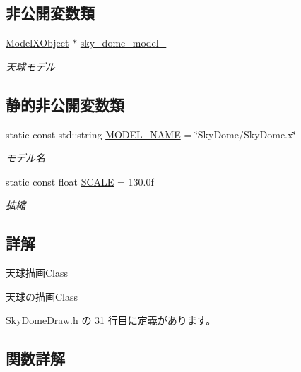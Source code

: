 \subsection*{非公開変数類}
\begin{DoxyCompactItemize}
\item 
\mbox{\hyperlink{class_model_x_object}{Model\+X\+Object}} $\ast$ \mbox{\hyperlink{class_sky_dome_draw_a2453fb04f979443c61acc10eafa183aa}{sky\+\_\+dome\+\_\+model\+\_\+}}
\begin{DoxyCompactList}\small\item\em 天球モデル \end{DoxyCompactList}\end{DoxyCompactItemize}
\subsection*{静的非公開変数類}
\begin{DoxyCompactItemize}
\item 
static const std\+::string \mbox{\hyperlink{class_sky_dome_draw_a366fd9d1040d77ddac71e335f10f2c29}{M\+O\+D\+E\+L\+\_\+\+N\+A\+ME}} = \char`\"{}Sky\+Dome/Sky\+Dome.\+x\char`\"{}
\begin{DoxyCompactList}\small\item\em モデル名 \end{DoxyCompactList}\item 
static const float \mbox{\hyperlink{class_sky_dome_draw_a50389a4bcc210ebd4b2ca93a161ecae6}{S\+C\+A\+LE}} = 130.\+0f
\begin{DoxyCompactList}\small\item\em 拡縮 \end{DoxyCompactList}\end{DoxyCompactItemize}


\subsection{詳解}
天球描画\+Class 

天球の描画\+Class 

 Sky\+Dome\+Draw.\+h の 31 行目に定義があります。



\subsection{関数詳解}
\mbox{\label{class_sky_dome_draw_a42364ea42618cbab588d55050edfe95a}} 
